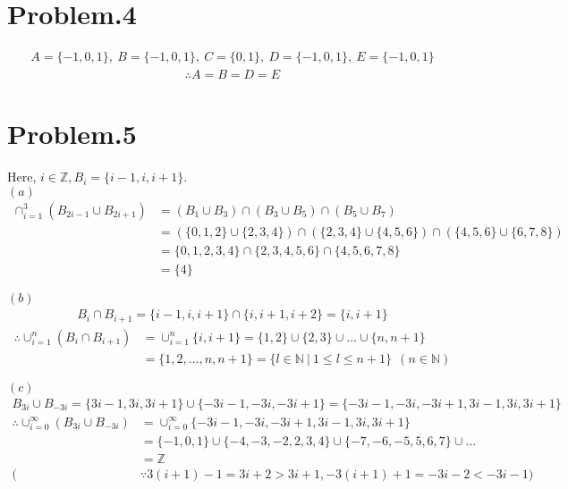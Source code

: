 \documentclass[12pt]{article}
\begin{document}
\section*{Problem.4}
\begin{gather*}
A = \{-1, 0, 1\},~B = \{-1, 0, 1\},~C = \{0, 1\},~D = \{-1,0,1\},~E = \{-1,0,1\}
\end{gather*}
\begin{gather*}
\therefore A = B = D = E 
\end{gather*}

\section*{Problem.5}
Here, $ i \in \mathbb{Z}, B_i = \{i-1,i,i+1\} $. \\[1em]
$(a)$
\begin{align*}
\cap^{3}_{i=1} \left(B_{2i-1} \cup B_{2i+1}\right) &= \left(B_{1} \cup B_{3}\right) \cap \left(B_{3} \cup B_{5}\right) \cap \left(B_{5} \cup B_{7}\right)\\[1em]
&= \left(\{0,1,2\} \cup \{2,3,4\}\right) \cap \left(\{2,3,4\} \cup \{4,5,6\}\right) \cap \left(\{4,5,6\} \cup \{6,7,8\}\right)\\[1em]
&= \{0,1,2,3,4\} \cap \{2,3,4,5,6\} \cap \{4,5,6,7,8\}\\[1em]
&= \{4\}
\end{align*}


$(b)$
\begin{gather*}
B_{i} \cap B_{i+1} = \{i-1,i,i+1\} \cap \{i,i+1,i+2\} = \{i,i+1\}
\end{gather*}
\begin{align*}
\therefore \cup^{n}_{i=1} \left(B_{i} \cap B_{i+1}\right) &= \cup^{n}_{i=1} \{i,i+1\} = \{1,2\} \cup \{2,3\} \cup \dots \cup \{n,n+1\}\\[1em]
&= \{1,2,\dots,n,n+1\} = \{l \in \mathbb{N}~|~ 1 \leq l \leq n+1\}~~(n \in \mathbb{N})
\end{align*}

$(c)$
\begin{gather*}
B_{3i} \cup B_{-3i} = \{3i-1,3i,3i+1\} \cup \{-3i-1,-3i,-3i+1\} = \{-3i-1,-3i,-3i+1,3i-1,3i,3i+1\}
\end{gather*}
\begin{align*}
\therefore \cup^{\infty}_{i=0} \left(B_{3i} \cup B_{-3i}\right) &= \cup^{\infty}_{i=0} \{-3i-1,-3i,-3i+1,3i-1,3i,3i+1\}\\[1em]
&= \{-1,0,1\} \cup \{-4,-3,-2,2,3,4\} \cup \{-7,-6,-5,5,6,7\} \cup \dots\\[1em]
&= \mathbb{Z}\\[1em]
(&\because 3(i+1)-1 = 3i+2 > 3i + 1, -3(i+1)+1 = -3i-2 < -3i -1) 
\end{align*}
\end{document}
